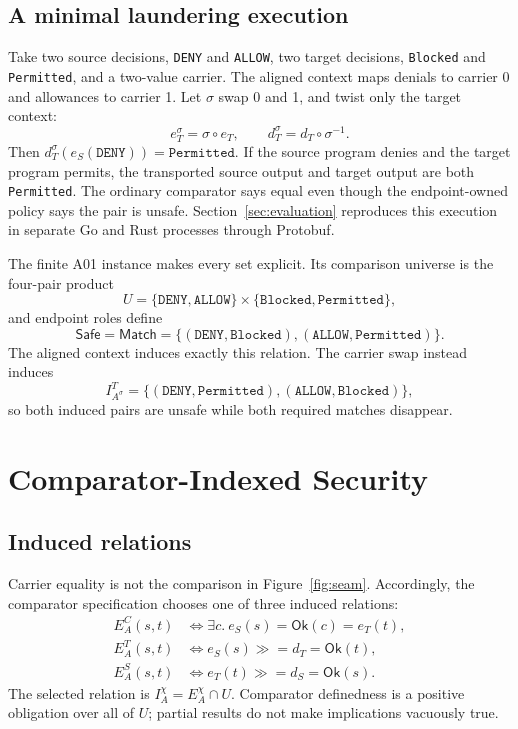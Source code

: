 \documentclass[sigconf,anonymous,review]{acmart}
\newcommand{\ok}{\mathsf{Ok}}
\newcommand{\safe}{\mathsf{Safe}}
\newcommand{\matchrel}{\mathsf{Match}}
\begin{document}
\subsection{A minimal laundering execution}

Take two source decisions, \texttt{DENY} and \texttt{ALLOW}, two target
decisions, \texttt{Blocked} and \texttt{Permitted}, and a two-value
carrier.  The aligned context maps denials to carrier 0 and allowances
to carrier 1.  Let $\sigma$ swap 0 and 1, and twist only the target
context:
\[
e_T^\sigma=\sigma\circ e_T,\qquad
d_T^\sigma=d_T\circ\sigma^{-1}.
\]
Then $d_T^\sigma(e_S(\texttt{DENY}))=\texttt{Permitted}$.  If the
source program denies and the target program permits, the transported
source output and target output are both \texttt{Permitted}.  The
ordinary comparator says equal even though the endpoint-owned policy
says the pair is unsafe.  Section~\ref{sec:evaluation} reproduces this
execution in separate Go and Rust processes through Protobuf.

The finite A01 instance makes every set explicit.  Its comparison universe
is the four-pair product
\[
U=\{\texttt{DENY},\texttt{ALLOW}\}\times
  \{\texttt{Blocked},\texttt{Permitted}\},
\]
and endpoint roles define
\[
\safe=\matchrel=
\{(\texttt{DENY},\texttt{Blocked}),
  (\texttt{ALLOW},\texttt{Permitted})\}.
\]
The aligned context induces exactly this relation.  The carrier swap instead
induces
\[
I_{A^\sigma}^T=
\{(\texttt{DENY},\texttt{Permitted}),
  (\texttt{ALLOW},\texttt{Blocked})\},
\]
so both induced pairs are unsafe while both required matches disappear.

\section{Comparator-Indexed Security}
\label{sec:model}

\subsection{Induced relations}

Carrier equality is not the comparison in Figure~\ref{fig:seam}.
Accordingly, the comparator specification chooses one of three induced
relations:
\begin{align}
E_A^C(s,t) &\iff \exists c.\ e_S(s)=\ok(c)=e_T(t),\label{eq:carrier}\\
E_A^T(s,t) &\iff e_S(s)\mathbin{\gg=}d_T=\ok(t),\label{eq:target}\\
E_A^S(s,t) &\iff e_T(t)\mathbin{\gg=}d_S=\ok(s).\label{eq:source}
\end{align}
The selected relation is $I_A^\chi=E_A^\chi\cap U$.  Comparator
definedness is a positive obligation over all of $U$; partial results
do not make implications vacuously true.
\end{document}
